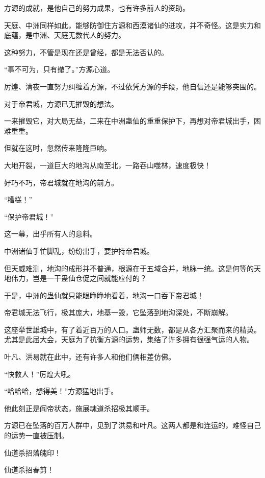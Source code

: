 
\begin{this_body}

方源的成就，是他自己的努力成果，也有许多前人的资助。

天庭、中洲同样如此，能够防御住方源和西漠诸仙的进攻，并不奇怪。这是实力和底蕴，是中洲、天庭无数代人的努力。

这种努力，不管是现在还是曾经，都是无法否认的。

“事不可为，只有撤了。”方源心道。

厉煌、清夜一直努力纠缠着方源，不过依凭方源的手段，他自信还是能够突围的。

对于帝君城，方源已无摧毁的想法。

一来摧毁它，对大局无益，二来在中洲蛊仙的重重保护下，再想对帝君城出手，困难重重。

但就在这时，忽然传来隆隆巨响。

大地开裂，一道巨大的地沟从南至北，一路吞山噬林，速度极快！

好巧不巧，帝君城就在地沟的前方。

“糟糕！”

“保护帝君城！”

这一幕，出乎所有人的意料。

中洲诸仙手忙脚乱，纷纷出手，要护持帝君城。

但天威难测，地沟的成形并不普通，根源在于五域合并，地脉一统。这是何等的天地伟力，岂是一干蛊仙仓促之间就能应付的？

于是，中洲的蛊仙就只能眼睁睁地看着，地沟一口吞下帝君城！

帝君城无法飞行，极其庞大，地基一毁，它坠落到地沟深处，不断崩解。

这座举世雄城中，有了着近百万的人口。蛊师无数，都是从各方汇聚而来的精英。尤其是此届大会，天庭为了抗衡方源的运势，集结了许多拥有很强气运的人物。

叶凡、洪易就在此中，还有许多人和他们俩相差仿佛。

“快救人！”厉煌大吼。

“哈哈哈，想得美！”方源猛地出手。

他此刻正是阎帝状态，施展魂道杀招极其顺手。

方源已在坠落的百万人群中，见到了洪易和叶凡。这两人都是和连运的，难怪自己的运势一直被压制。

仙道杀招落魄印！

仙道杀招春剪！


\end{this_body}
